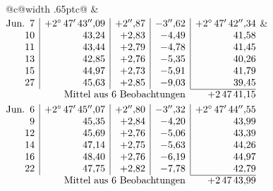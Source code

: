 \noindent\begin{tabular}{@{}c@{\hspace{.4em}\vrule width .65pt\hspace{.4em}}c@{}}
 &
 \\[.18ex]
\(\begin{array}[t]{@{}r|r|r|r|r@{}}
\text{Jun.}\enspace 7 & +2^\circ\,47'\,43''{,}09 & +2''{,}87 & -3''{,}62 & +2^\circ\,47'\,42''{,}34\\
10 & 43{,}24 & +2{,}83 & -4{,}49 & 41{,}58\\
11 & 43{,}44 & +2{,}79 & -4{,}78 & 41{,}45\\
13 & 42{,}85 & +2{,}76 & -5{,}35 & 40{,}26\\
15 & 44{,}97 & +2{,}73 & -5{,}91 & 41{,}79\\
27 & 45{,}63 & +2{,}85 & -9{,}03 & 39{,}45\\
\cline{5-5}
\multicolumn{4}{r}{\text{Mittel aus 6 Beobachtungen}} & +2\,47\,41{,}15
\end{array}\)
&
\(\begin{array}[t]{@{}r|r|r|r|r@{}}
\text{Jun.}\enspace 6 & +2^\circ\,47'\,45''{,}07 & +2''{,}80 & -3''{,}32 & +2^\circ\,47'\,44''{,}55\\
9 & 45{,}35 & +2{,}84 & -4{,}20 & 43{,}99\\
12 & 45{,}69 & +2{,}76 & -5{,}06 & 43{,}39\\
14 & 47{,}14 & +2{,}75 & -5{,}63 & 44{,}26\\
16 & 48{,}40 & +2{,}76 & -6{,}19 & 44{,}97\\
22 & 47{,}75 & +2{,}82 & -7{,}78 & 42{,}79\\
\cline{5-5}
\multicolumn{4}{r}{\text{Mittel aus 6 Beobachtungen}} & +2\,47\,43{,}99
\end{array}\)
\end{tabular}\par\medskip
{}
